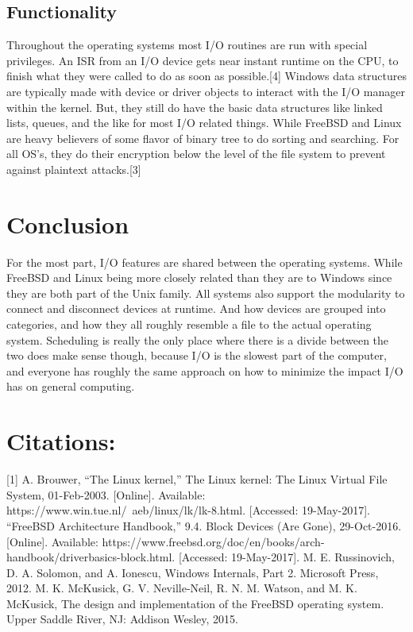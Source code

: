 \documentclass[10pt,conference,draftclsnofoot,onecolumn]{IEEEtran}
\begin{document}
\subsection{Functionality}
    Throughout the operating systems most I/O routines are run with special privileges. An ISR from an I/O device gets near instant runtime on the CPU, to finish what they were called to do as soon as possible.[4] Windows data structures are typically made with device or driver objects to interact with the I/O manager within the kernel. But, they still do have the basic data structures like linked lists, queues, and the like for most I/O related things. While FreeBSD and Linux are heavy believers of some flavor of binary tree to do sorting and searching.  For all OS’s, they do their encryption below the level of the file system to prevent against plaintext attacks.[3]
    

\section{Conclusion}
    For the most part, I/O features are shared between the operating systems. While FreeBSD and Linux being more closely related than they are to Windows since they are both part of the Unix family. All systems also support the modularity to connect and disconnect devices at runtime. And how devices are grouped into categories, and how they all roughly resemble a file to the actual operating system. Scheduling is really the only place where there is a divide between the two does make sense though, because I/O is the slowest part of the computer, and everyone has roughly the same approach on how to minimize the impact I/O has on general computing.



\newpage
\section{Citations:}
[1] A. Brouwer, “The Linux kernel,” The Linux kernel: The Linux Virtual File System, 01-Feb-2003. [Online]. Available: https://www.win.tue.nl/~aeb/linux/lk/lk-8.html. [Accessed: 19-May-2017]. \newline \newline
[2]“FreeBSD Architecture Handbook,” 9.4. Block Devices (Are Gone), 29-Oct-2016. [Online]. Available: https://www.freebsd.org/doc/en/books/arch-handbook/driverbasics-block.html. [Accessed: 19-May-2017]. \newline \newline
[3] M. E. Russinovich, D. A. Solomon, and A. Ionescu, Windows Internals, Part 2. Microsoft Press, 2012. \newline \newline
[4] M. K. McKusick, G. V. Neville-Neil, R. N. M. Watson, and M. K. McKusick, The design and implementation of the FreeBSD operating system. Upper Saddle River, NJ: Addison Wesley, 2015.
\end{document}
